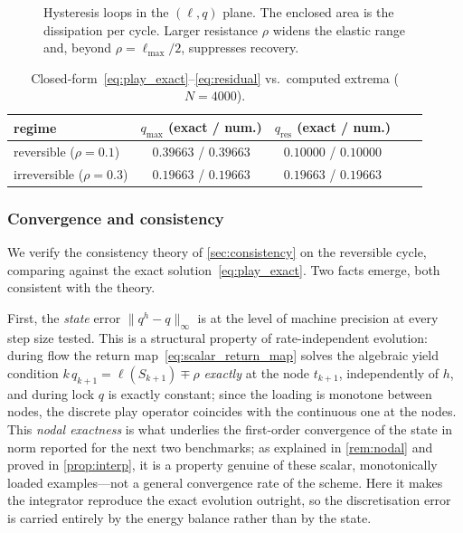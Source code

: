 \begin{figure}[t]
  \centering
  \caption{Hysteresis loops in the $(\ell,q)$ plane. The enclosed area
  is the dissipation per cycle. Larger resistance $\rho$ widens the
  elastic range and, beyond $\rho=\ell_{\max}/2$, suppresses recovery.}
  \label{fig:loops}
\end{figure}

\begin{table}[t]
  \centering
  \caption{Closed-form~\eqref{eq:play_exact}--\eqref{eq:residual} vs.\
  computed extrema ($N=4000$).}
  \label{tab:val}
  \begin{tabular}{lcccc}
    \toprule
    regime & $q_{\max}$ (exact / num.) & $q_{\mathrm{res}}$ (exact / num.) \\
    \midrule
    reversible ($\rho=0.1$)   & $0.39663$ / $0.39663$ & $0.10000$ / $0.10000$ \\
    irreversible ($\rho=0.3$) & $0.19663$ / $0.19663$ & $0.19663$ / $0.19663$ \\
    \bottomrule
  \end{tabular}
\end{table}

\subsubsection{Convergence and consistency}\label{sec:conv_exp}

We verify the consistency theory of \cref{sec:consistency} on the
reversible cycle, comparing against the exact
solution~\eqref{eq:play_exact}. Two facts emerge, both consistent with
the theory.

First, the \emph{state} error $\|q^h-q\|_\infty$ is at the level of
machine precision at every step size tested. This is a structural
property of rate-independent evolution: during flow the return
map~\eqref{eq:scalar_return_map} solves the algebraic yield condition
$k\,q_{k+1}=\ell(S_{k+1})\mp\rho$ \emph{exactly} at the node
$t_{k+1}$, independently of $h$, and during lock $q$ is exactly
constant; since the loading is monotone between nodes, the discrete
play operator coincides with the continuous one at the nodes. This
\emph{nodal exactness} is what underlies the first-order convergence of
the state in norm reported for the next two benchmarks; as explained in
\cref{rem:nodal} and proved in \cref{prop:interp}, it is a property
genuine of these scalar, monotonically loaded examples---not a general
convergence rate of the scheme. Here it makes the integrator reproduce
the exact evolution outright, so the discretisation error is carried
entirely by the energy balance rather than by the state.

